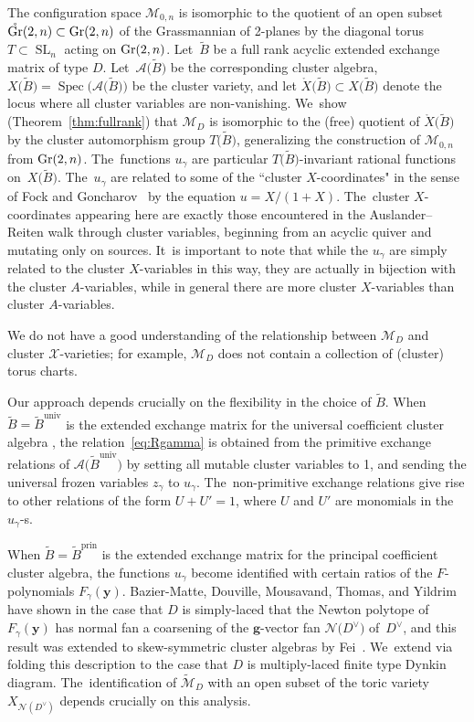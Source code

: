 \documentclass[pdftex]{sigma}%
\def\A{{\mathcal{A}}}
\def\Gr{{\rm Gr}}
\def\oGr{{\mathring{\Gr}}}
\def\Xo{{\mathring{X}}}
\def\Spec{\operatorname{Spec}}
\def\prin{{\operatorname{prin}}}
\def\univ{{\operatorname{univ}}}
\def\tB{{\tilde B}}
\def\M{{\mathcal{M}}}
\def\tM{{\widetilde {\mathcal{M}}}}
\def\tB{{\tilde B}}
\def\y{{\mathbf y}}
\def\N{{\mathcal{N}}}
\def\SL{\operatorname{SL}}
\def\g{{\mathbf g}}
\numberwithin{equation}{section}
\begin{document}
\bigskip{} The configuration space $\M_{0,n}$ is isomorphic to the quotient of an open subset $\oGr(2,n) \subset \Gr(2,n)$ of the Grassmannian of 2-planes by the diagonal torus $T \subset \SL_n$ acting on $\Gr(2,n)$. Let~$\tB$ be a full rank acyclic extended exchange matrix of type $D$. Let~$\A\big(\tB\big)$ be the corresponding cluster algebra, $X\big(\tB\big) = \Spec\big(\A\big(\tB\big)\big)$ be the cluster variety, and let $\Xo\big(\tB\big) \subset X\big(\tB\big)$ denote the locus where all cluster variables are non-vanishing. We~show (Theorem~\ref{thm:fullrank}) that $\M_D$ is isomorphic to the (free) quotient of $\Xo\big(\tB\big)$ by the cluster automorphism group $T\big(\tB\big)$, generalizing the construction of $\M_{0,n}$ from $\Gr(2,n)$. The~functions $u_\gamma$ are particular $T\big(\tB\big)$-invariant rational functions on~$X\big(\tB\big)$. The~$u_\gamma$ are related to some of the ``cluster $X$-coordinates" in the sense of Fock and Goncharov~\cite{FG} by the equation $u = X/(1+X)$. The~cluster $X$-coordinates appearing here are exactly those encountered in the Auslander--Reiten walk through cluster variables, beginning from an acyclic quiver and mutating only on sources. It~is important to note that while the $u_\gamma$ are simply related to the cluster $X$-variables in this way, they are actually in bijection with the cluster $A$-variables, while in general there are more cluster $X$-variables than cluster $A$-variables.

We do not have a good understanding of the relationship between $\M_D$ and cluster ${\mathcal{X}}$-varieties; for example, $\M_D$ does not contain a collection of (cluster) torus charts.

Our approach depends crucially on the flexibility in the choice of $\tB$. When $\tB = \tB^\univ$ is the extended exchange matrix for the universal coefficient cluster algebra \cite{CA4,Reading}, the relation~\eqref{eq:Rgamma} is obtained from the primitive exchange relations of $\A\big(\tB^\univ\big)$ by setting all mutable cluster variables to 1, and sending the universal frozen variables $z_\gamma$ to $u_\gamma$. The~non-primitive exchange relations give rise to other relations of the form $U + U' = 1$, where $U$ and $U'$ are monomials in the $u_\gamma$-s.

When $\tB = \tB^\prin$ is the extended exchange matrix for the principal coefficient cluster algebra, the functions $u_\gamma$ become identified with certain ratios of the $F$-polynomials $F_\gamma(\y)$. Bazier-Matte, Douville, Mousavand, Thomas, and Yildrim have shown \cite{BDMTY} in the case that $D$ is simply-laced that the Newton polytope of $F_\gamma(\y)$ has normal fan a coarsening of the $\g$-vector fan $\N\big(D^\vee\big)$ of~$D^\vee$, and this result was extended to skew-symmetric cluster algebras by Fei~\cite{Fei2}. We~extend via folding this description to the case that $D$ is multiply-laced finite type Dynkin diagram. The~identification of $\tM_D$ with an open subset of the toric variety $X_{\N(D^\vee)}$ depends crucially on this analysis.
\end{document}
